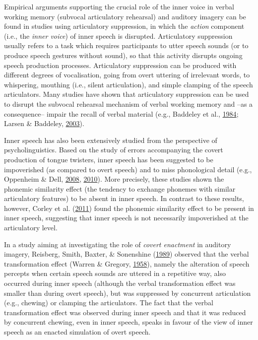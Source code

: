 \documentclass[a4paper,12pt,twoside,openright,oldfontcommands]{memoir}
\begin{document}
Empirical arguments supporting the crucial role of the inner voice in verbal working memory (subvocal articulatory rehearsal) and auditory imagery can be found in studies using articulatory suppression, in which the \emph{action} component (i.e., the \emph{inner voice}) of inner speech is disrupted. Articulatory suppression usually refers to a task which requires participants to utter speech sounds (or to produce speech gestures without sound), so that this activity disrupts ongoing speech production processes. Articulatory suppression can be produced with different degrees of vocalisation, going from overt uttering of irrelevant words, to whispering, mouthing (i.e., silent articulation), and simple clamping of the speech articulators. Many studies have shown that articulatory suppression can be used to disrupt the subvocal rehearsal mechanism of verbal working memory and --as a consequence-- impair the recall of verbal material (e.g., Baddeley et al., \protect\hyperlink{ref-baddeley_exploring_1984}{1984}; Larsen \& Baddeley, \protect\hyperlink{ref-larsen_disruption_2003}{2003}).

Inner speech has also been extensively studied from the perspective of psycholinguistics. Based on the study of errors accompanying the covert production of tongue twisters, inner speech has been suggested to be impoverished (as compared to overt speech) and to miss phonological detail (e.g., Oppenheim \& Dell, \protect\hyperlink{ref-oppenheim_inner_2008}{2008}, \protect\hyperlink{ref-oppenheim_motor_2010}{2010}). More precisely, these studies shown the phonemic similarity effect (the tendency to exchange phonemes with similar articulatory features) to be absent in inner speech. In contrast to these results, however, Corley et al. (\protect\hyperlink{ref-corley_error_2011}{2011}) found the phonemic similarity effect to be present in inner speech, suggesting that inner speech is not necessarily impoverished at the articulatory level.

In a study aiming at investigating the role of \emph{covert enactment} in auditory imagery, Reisberg, Smith, Baxter, \& Sonenshine (\protect\hyperlink{ref-reisberg_enacted_1989}{1989}) observed that the verbal transformation effect (Warren \& Gregory, \protect\hyperlink{ref-warren_auditory_1958}{1958}), namely the alteration of speech percepts when certain speech sounds are uttered in a repetitive way, also occurred during inner speech (although the verbal transformation effect was smaller than during overt speech), but was suppressed by concurrent articulation (e.g., chewing) or clamping the articulators. The fact that the verbal transformation effect was observed during inner speech and that it was reduced by concurrent chewing, even in inner speech, speaks in favour of the view of inner speech as an enacted simulation of overt speech.
\end{document}
